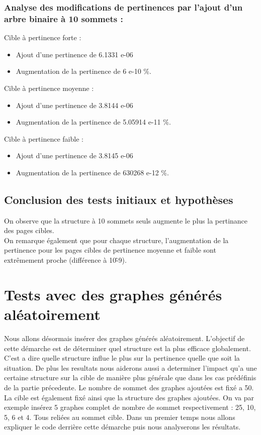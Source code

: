 \documentclass[a4paper,11pt]{article}
\begin{document}
		\subsubsection{Analyse des modifications de pertinences par l'ajout d'un arbre binaire à 10 sommets :}
			Cible à pertinence forte :
			\begin{itemize} 	
				\item Ajout d'une pertinence de 6.1331 e-06
				\item Augmentation de la pertinence de 6 e-10 \%.
			\end{itemize}
			Cible à pertinence moyenne :
			\begin{itemize} 	
				\item Ajout d'une pertinence de 3.8144 e-06
				\item Augmentation de la pertinence de 5.05914 e-11 \%.
			\end{itemize}
			Cible à pertinence faible :
			\begin{itemize} 	
				\item Ajout d'une pertinence de 3.8145 e-06
				\item Augmentation de la pertinence de 630268 e-12 \%.
			\end{itemize}

	\subsection{Conclusion des tests initiaux et hypothèses}
		On observe que la structure à 10 sommets seuls augmente le plus la pertinance des pages cibles.\\
		On remarque également que pour chaque structure, l'augmentation de la pertinence pour les pages cibles de pertinence moyenne et faible sont extrêmement proche (différence à 10\^-9).\\

\section{Tests avec des graphes générés aléatoirement}
	Nous allons désormais insérer des graphes générés aléatoirement.
	L'objectif de cette démarche est de déterminer quel structure est la plus efficace globalement.
	C'est a dire quelle structure influe le plus sur la pertinence quelle que soit la situation.
	De plus les resultats nous aiderons aussi a determiner l'impact qu'a une certaine structure sur la cible de manière plus générale 
	que dans les cas prédéfinis de la partie précedente.
	Le nombre de sommet des graphes ajoutées est fixé a 50.
	La cible est également fixé ainsi que la structure des graphes ajoutées.
	On va par exemple insérez 5 graphes complet de nombre de sommet respectivement : 25, 10, 5, 6 et 4. Tous reliées au sommet cible.
	Dans un premier temps nous allons expliquer le code derrière cette démarche puis nous analyserons les résultats.
\end{document}
